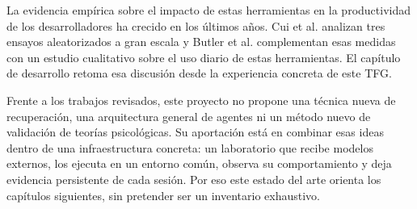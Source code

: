 La evidencia empírica sobre el impacto de estas herramientas en la productividad
de los desarrolladores ha crecido en los últimos años. Cui et al.
\cite{cui2025effects} analizan tres ensayos aleatorizados a gran escala y
Butler et al. \cite{butler2024dear} complementan esas medidas con un estudio
cualitativo sobre el uso diario de estas herramientas. El capítulo de desarrollo
retoma esa discusión desde la experiencia concreta de este TFG.

Frente a los trabajos revisados, este proyecto no propone una técnica nueva de
recuperación, una arquitectura general de agentes ni un método nuevo de
validación de teorías psicológicas. Su aportación está en combinar esas ideas
dentro de una infraestructura concreta: un laboratorio que recibe modelos
externos, los ejecuta en un entorno común, observa su comportamiento y deja
evidencia persistente de cada sesión. Por eso este estado del arte orienta los
capítulos siguientes, sin pretender ser un inventario exhaustivo.
